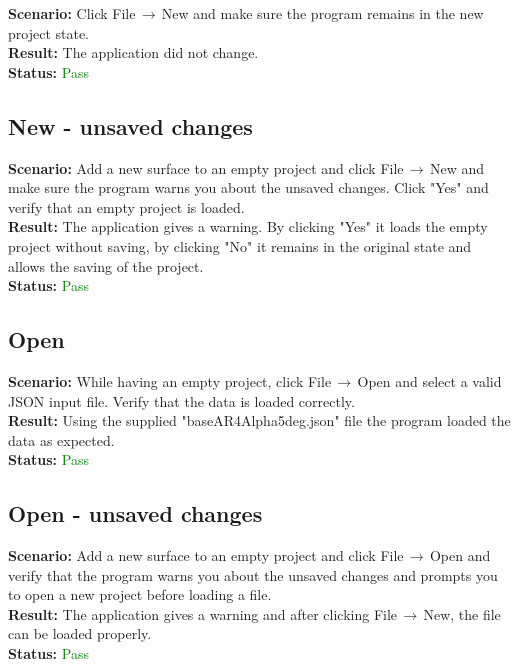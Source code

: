 \documentclass[a4paper, 11pt, article]{report}
\begin{document}
\noindent \textbf{Scenario:} Click File$\,\to\,$New and make sure the program remains in the new project state. 
\\
\noindent \textbf{Result:} The application did not change.
\\
\noindent \textbf{Status:} \textcolor{green}{Pass}

\subsection{New - unsaved changes}

\noindent \textbf{Scenario:} Add a new surface to an empty project and click File$\,\to\,$New and make sure the program warns you about the unsaved changes. Click "Yes" and verify that an empty project is loaded.
\\
\noindent \textbf{Result:} The application gives a warning. By clicking "Yes" it loads the empty project without saving, by clicking "No" it remains in the original state and allows the saving of the project.
\\
\noindent \textbf{Status:} \textcolor{green}{Pass}

\subsection{Open}

\noindent \textbf{Scenario:} While having an empty project, click File$\,\to\,$Open and select a valid JSON input file. Verify that the data is loaded correctly.
\\
\noindent \textbf{Result:} Using the supplied "baseAR4Alpha5deg.json" file the program loaded the data as expected.
\\
\noindent \textbf{Status:} \textcolor{green}{Pass}

\subsection{Open - unsaved changes}

\noindent \textbf{Scenario:} Add a new surface to an empty project and click File$\,\to\,$Open and verify that the program warns you about the unsaved changes and prompts you to open a new project before loading a file.
\\
\noindent \textbf{Result:} The application gives a warning and after clicking File$\,\to\,$New, the file can be loaded properly.
\\
\noindent \textbf{Status:} \textcolor{green}{Pass}
\end{document}
